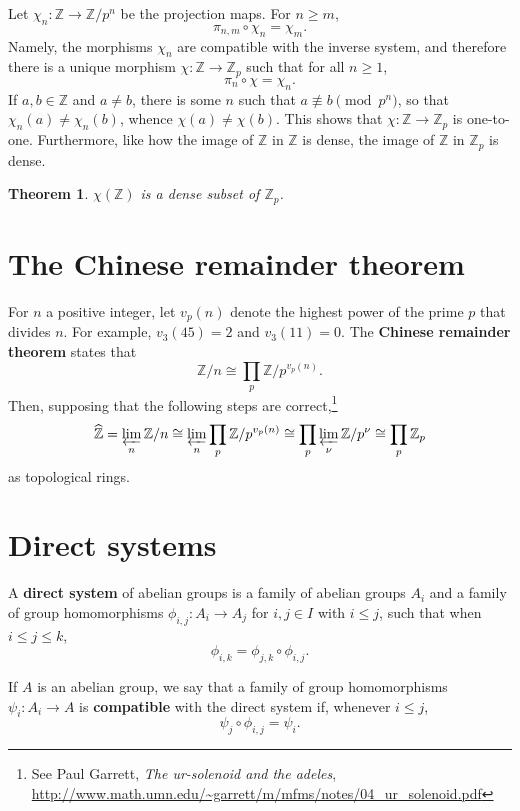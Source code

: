 \documentclass{article}
\newtheorem{theorem}{Theorem}
\theoremstyle{definition}
\begin{document}
Let $\chi_n:\mathbb{Z} \to \mathbb{Z}/p^n$ be the projection maps. For $n \geq m$,
\[
\pi_{n,m} \circ \chi_n = \chi_m.
\]
Namely,  the morphisms $\chi_n$ are compatible with the inverse system, and therefore there is a unique morphism 
$\chi:\mathbb{Z} \to \mathbb{Z}_p$ such that for all $n \geq 1$,
\[
\pi_n \circ \chi = \chi_n.
\]
If $a,b \in \mathbb{Z}$ and $a \neq b$, there is some $n$ such that $a \not \equiv b \pmod{p^n}$, so that
$\chi_n(a) \neq \chi_n(b)$, whence $\chi(a) \neq \chi(b)$. This shows that $\chi:\mathbb{Z} \to \mathbb{Z}_p$ is one-to-one.
Furthermore, like how the  image  of $\mathbb{Z}$ in $\widehat{\mathbb{Z}}$ is dense,
the image of $\mathbb{Z}$ in $\mathbb{Z}_p$ is dense.

\begin{theorem}
$\chi(\mathbb{Z})$ is a dense subset of $\mathbb{Z}_p$. 
\end{theorem}


\section{The Chinese remainder theorem}
For $n$ a positive integer, let $v_p(n)$ denote the highest power of the prime $p$ that divides $n$. For example, $v_3(45)=2$
and $v_3(11)=0$. The \textbf{Chinese remainder theorem} states that
\[
\mathbb{Z}/n \cong  \prod_p \mathbb{Z}/p^{v_p(n)}.
\]
Then, supposing that the following steps are correct,\footnote{See Paul Garrett, {\em The ur-solenoid and the adeles},
\url{http://www.math.umn.edu/~garrett/m/mfms/notes/04_ur_solenoid.pdf}}
\[
\widehat{\mathbb{Z}}  = \varprojlim_n \mathbb{Z}/n 
\cong \varprojlim_n \prod_p \mathbb{Z}/p^{v_p(n)}
\cong \prod_p \varprojlim_\nu \mathbb{Z}/p^{\nu}
\cong \prod_p \mathbb{Z}_p
\]
as topological rings.


\section{Direct systems}
A \textbf{direct system} of abelian groups  is a family of abelian groups
$A_i$ and a family of group homomorphisms $\phi_{i,j}:A_i \to A_j$ for $i,j \in I$ with $i \leq j$, such that when $i \leq j \leq k$,
\[
\phi_{i,k} = \phi_{j,k} \circ \phi_{i,j}.
\]

If $A$ is an abelian group,
we say that a family of group homomorphisms $\psi_i:A_i \to A$ is \textbf{compatible} with the direct system if, whenever $i \leq j$,
\[
 \psi_j \circ \phi_{i,j}  = \psi_i.
\]
\end{document}
